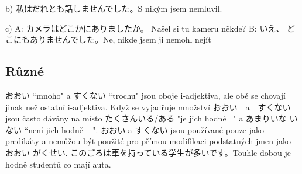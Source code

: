 b) 私はだれとも話しませんでした。S nikým jsem nemluvil.

c)
 A: カメラはどこかにありましたか。 Našel si tu kameru někde?
B: いえ、 どこにもありませんでした。Ne, nikde jsem ji nemohl nejít

\subsection{Různé}


おおい “mnoho" a すくない “trochu" jsou oboje i-adjektiva, ale obě se chovají jinak než ostatní i-adjektiva. Když se vyjadřuje množství おおい　a　すくない jsou často dávány na místo  たくさんいる/ある "je jich hodně ~" a あまりいな いない “není jich hodně ~ ". おおい a すくない jsou používané pouze jako predikáty a nemůžou být použité pro přímou modifikaci podstatných jmen jako  おおい がくせい.
このごろは車を持っている学生が多いです。Touhle dobou je hodně studentů co mají auta.






